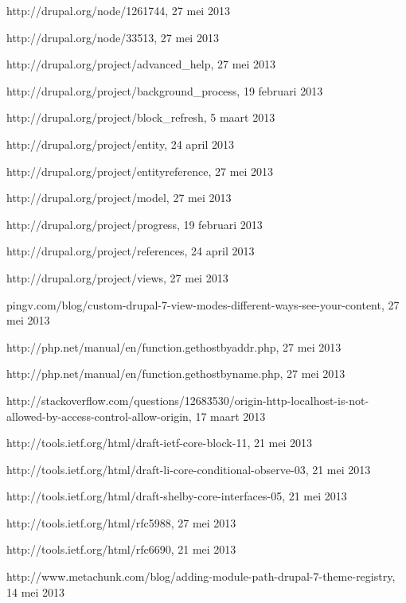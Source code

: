 \begin{thebibliography}{99}
 http://drupal.org/node/1261744, 27 mei 2013

 http://drupal.org/node/33513, 27 mei 2013

 http://drupal.org/project/advanced\_help, 27 mei 2013

 http://drupal.org/project/background\_process, 19 februari 2013

 http://drupal.org/project/block\_refresh, 5 maart 2013

 http://drupal.org/project/entity, 24 april 2013

 http://drupal.org/project/entityreference, 27 mei 2013

 http://drupal.org/project/model, 27 mei 2013

 http://drupal.org/project/progress, 19 februari 2013

 http://drupal.org/project/references, 24 april 2013

 http://drupal.org/project/views, 27 mei 2013

 pingv.com/blog/custom-drupal-7-view-modes-different-ways-see-your-content, 27 mei 2013

 http://php.net/manual/en/function.gethostbyaddr.php, 27 mei 2013

 http://php.net/manual/en/function.gethostbyname.php, 27 mei 2013

 http://stackoverflow.com/questions/12683530/origin-http-localhost-is-not-allowed-by-access-control-allow-origin, 17 maart 2013

 http://tools.ietf.org/html/draft-ietf-core-block-11, 21 mei 2013

 http://tools.ietf.org/html/draft-li-core-conditional-observe-03, 21 mei 2013

 http://tools.ietf.org/html/draft-shelby-core-interfaces-05, 21 mei 2013

 http://tools.ietf.org/html/rfc5988, 27 mei 2013

 http://tools.ietf.org/html/rfc6690, 21 mei 2013

 http://www.metachunk.com/blog/adding-module-path-drupal-7-theme-registry, 14 mei 2013


\end{thebibliography}
